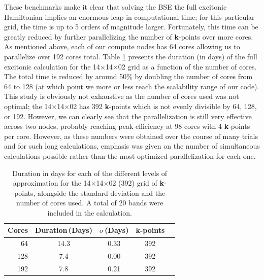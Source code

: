 \documentclass[aps,prb,10pt,showpacs,superscriptaddress,twocolumn,notitlepage]{revtex4-1}
\begin{document}
These benchmarks make it clear that solving the BSE the full excitonic
Hamiltonian implies an enormous leap in computational time; for this particular
grid, the time is up to 5 orders of magnitude larger. Fortunately, this time can
be greatly reduced by further parallelizing the number of \textbf{k}-points over
more cores. As mentioned above, each of our compute nodes has 64 cores allowing
us to parallelize over 192 cores total. Table \ref{tab:cores} presents the
duration (in days) of the full excitonic calculation for the
14$\times$14$\times$02 grid as a function of the number of cores. The total time
is reduced by around 50\% by doubling the number of cores from 64 to 128 (at
which point we more or less reach the scalability range of our code). This study
is obviously not exhaustive as the number of cores used was not optimal; the
14$\times$14$\times$02 has 392 \textbf{k}-points which is not evenly divisible
by 64, 128, or 192. However, we can clearly see that the parallelization is
still very effective across two nodes, probably reaching peak efficiency at 98
cores with 4 \textbf{k}-points per core. However, as these numbers were obtained
over the course of many trials and for such long calculations, emphasis was
given on the number of simultaneous calculations possible rather than the most
optimized parallelization for each one.

\begin{table}[t]
\caption{Duration in days for each of the different levels of approximation
for the 14$\times$14$\times$02 (392) grid of \textbf{k}-points, alongside the
standard deviation and the number of cores used. A total of 20 bands were
included in the calculation.}
\label{tab:cores}
\begin{ruledtabular}
\begin{tabular}{ r c c c c }
Cores & Duration\,(Days) & $\sigma$\,(Days) & \textbf{k}-points\\
\hline
 64   & 14.3             & 0.33             & 392 \\
128   &  7.4             & 0.00             & 392 \\
192   &  7.8             & 0.21             & 392
\end{tabular}
\end{ruledtabular}
\end{table}
\end{document}
